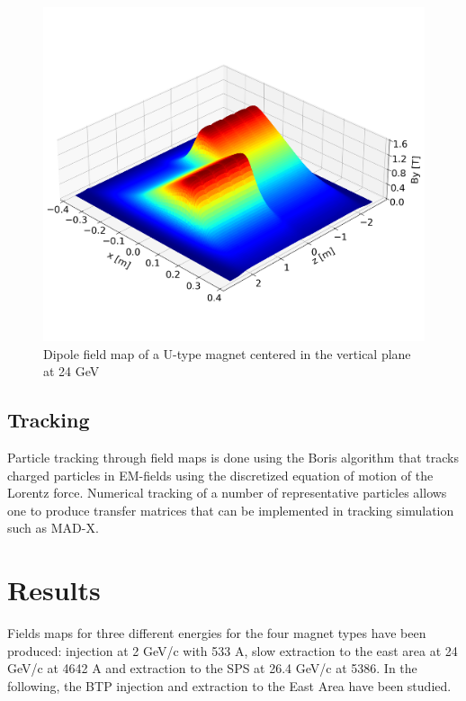 \documentclass[a4paper,
               biblatex,     %
               keeplastbox,   %
               ]{jacow}
\begin{document}
\begin{figure}[!htb]
   \centering
   \includegraphics*[width=1.0\columnwidth, trim={0 2.9cm 0 4.3cm},clip]{dipole_field.png}
   \caption{Dipole field map of a U-type magnet centered in the vertical plane at 24 GeV}
   \label{fig:dipole_field}
\end{figure}

\subsection{Tracking}
Particle tracking through field maps is done using the Boris algorithm that tracks charged particles in EM-fields using the discretized equation of motion of the Lorentz force\cite{qin_why_2013}\cite{ripperda_comprehensive_2018}. Numerical tracking of a number of representative particles allows one to produce transfer matrices that can be implemented in tracking simulation such as MAD-X.\cite{yoon_method_2013}
\section{Results}

Fields maps for three different energies for the four magnet types have been produced: injection at 2 GeV/c with 533 A, slow extraction to the east area at 24 GeV/c at 4642 A and extraction to the SPS at 26.4 GeV/c at 5386. In the following, the BTP injection and extraction to the East Area have been studied.
\end{document}
